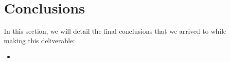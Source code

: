 \chapter{Conclusions}\label{ch:conclusion}
In this section, we will detail the final conclusions that we arrived to while making this deliverable:
\renewcommand{\labelitemi}{$\circ$}
\begin{itemize}
    \item 
\end{itemize}
